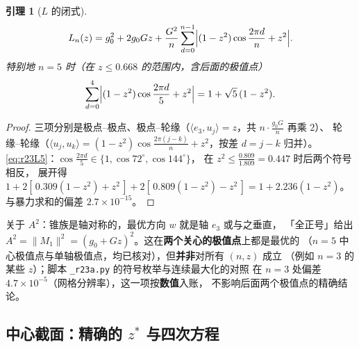\documentclass[UTF8,11pt]{ctexart}
\newtheorem{lemma}[theorem]{引理}
\theoremstyle{definition}
\begin{document}
\begin{lemma}[$L$ 的闭式]\label{lem:r23L}
\begin{equation}\label{eq:r23L}
L_n(z)=g_0^2+2g_0Gz+\frac{G^2}n\sum_{d=0}^{n-1}\Bigl|(1-z^2)\cos\frac{2\pi d}n+z^2\Bigr| .
\end{equation}
特别地 $n=5$ 时（在 $z\le0.668$ 的范围内，含后面的极值点）
\begin{equation}\label{eq:r23L5}
\sum_{d=0}^{4}\Bigl|(1-z^2)\cos\frac{2\pi d}5+z^2\Bigr|=1+\sqrt5\,(1-z^2).
\end{equation}
\end{lemma}

\begin{proof}
三项分别是极点--极点、极点--轮缘（$\langle e_3,u_j\rangle=z$，共 $n\cdot\frac{g_0G}n$ 再乘 $2$）、
轮缘--轮缘（$\langle u_j,u_k\rangle=(1-z^2)\cos\frac{2\pi(j-k)}n+z^2$，按差 $d=j-k$ 归并）。
\eqref{eq:r23L5}：$\cos\frac{2\pi d}5\in\{1,\cos72^\circ,\cos144^\circ\}$，
在 $z^2\le\frac{0.809}{1.809}=0.447$ 时后两个符号相反，
展开得 $1+2[\,0.309(1-z^2)+z^2\,]+2[\,0.809(1-z^2)-z^2\,]=1+2.236(1-z^2)$。
与暴力求和的偏差 $2.7\times10^{-15}$。
\end{proof}

关于 $A^2$：锥族是轴对称的，最优方向 $w$ 就是轴 $e_3$ 或与之垂直，
「全正号」给出 $A^2=\|M_1\|^2=(g_0+Gz)^2$。这在\textbf{两个关心的极值点}上都是最优的
（$n=5$ 中心极值点与单轴极值点，均已核对），但\textbf{并非}对所有 $(n,z)$ 成立
（例如 $n=3$ 的某些 $z$）；脚本 \texttt{\_r23a.py} 的符号枚举与连续最大化的对照
在 $n=3$ 处偏差 $4.7\times10^{-5}$（网格分辨率），这一项按\textbf{数值}入账，
不影响后面两个极值点的精确结论。

\subsection{中心截面：精确的 $z^*$ 与四次方程}\label{sec:r23:cent}
\end{document}
